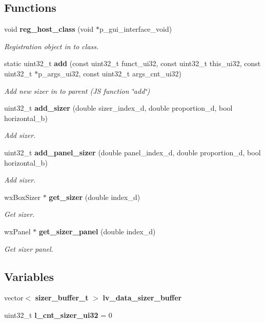 \subsection*{Functions}
\begin{DoxyCompactItemize}
\item 
void \textbf{ reg\+\_\+host\+\_\+class} (void $\ast$p\+\_\+gui\+\_\+interface\+\_\+void)
\begin{DoxyCompactList}\small\item\em Registration object in to class. \end{DoxyCompactList}\item 
static uint32\+\_\+t \textbf{ add} (const uint32\+\_\+t funct\+\_\+ui32, const uint32\+\_\+t this\+\_\+ui32, const uint32\+\_\+t $\ast$p\+\_\+args\+\_\+ui32, const uint32\+\_\+t args\+\_\+cnt\+\_\+ui32)
\begin{DoxyCompactList}\small\item\em Add new sizer in to parent (JS function \char`\"{}add\char`\"{}) \end{DoxyCompactList}\item 
uint32\+\_\+t \textbf{ add\+\_\+sizer} (double sizer\+\_\+index\+\_\+d, double proportion\+\_\+d, bool horizontal\+\_\+b)
\begin{DoxyCompactList}\small\item\em Add sizer. \end{DoxyCompactList}\item 
uint32\+\_\+t \textbf{ add\+\_\+panel\+\_\+sizer} (double panel\+\_\+index\+\_\+d, double proportion\+\_\+d, bool horizontal\+\_\+b)
\begin{DoxyCompactList}\small\item\em Add sizer. \end{DoxyCompactList}\item 
wx\+Box\+Sizer $\ast$ \textbf{ get\+\_\+sizer} (double index\+\_\+d)
\begin{DoxyCompactList}\small\item\em Get sizer. \end{DoxyCompactList}\item 
wx\+Panel $\ast$ \textbf{ get\+\_\+sizer\+\_\+panel} (double index\+\_\+d)
\begin{DoxyCompactList}\small\item\em Get sizer panel. \end{DoxyCompactList}\end{DoxyCompactItemize}
\subsection*{Variables}
\begin{DoxyCompactItemize}
\item 
vector$<$ \textbf{ sizer\+\_\+buffer\+\_\+t} $>$ \textbf{ lv\+\_\+data\+\_\+sizer\+\_\+buffer}
\item 
\mbox{\label{group___sizer_ga1d1ebe909be7ad82795656993c8eaaba}} 
uint32\+\_\+t {\bfseries l\+\_\+cnt\+\_\+sizer\+\_\+ui32} = 0
\end{DoxyCompactItemize}


